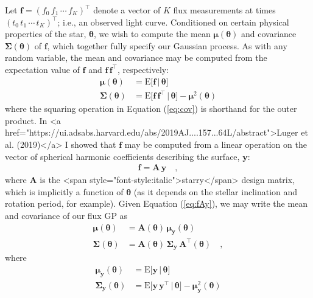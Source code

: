 Let
$\mathbf{f} = \left( f_0 \, f_1 \, \cdots \,  f_K \right)^\top$
denote a vector of $K$ flux measurements at times
$\left( t_0 \,  t_1 \,  \cdots \, t_K \right)^\top$; i.e., an observed
light curve.
Conditioned on certain physical properties of the star, $\pmb{\theta}$,
we wish to compute the mean $\pmb{\mu}(\pmb{\theta})$ and
covariance $\pmb{\Sigma}(\pmb{\theta})$
of $\mathbf{f}$, which together fully specify our Gaussian process.
As with any random variable, the mean and covariance may be computed from
the expectation value of $\mathbf{f}$ and
$\mathbf{f}\,\mathbf{f}^\top$, respectively:
\begin{align}
    \label{eq:mean}
    \pmb{\mu}(\pmb{\theta})
     & = \mathrm{E} \Big[ \mathbf{f} \, \Big| \, \pmb{\theta} \Big]
    \\
    \label{eq:cov}
    \pmb{\Sigma}(\pmb{\theta})
     & = \mathrm{E} \Big[ \mathbf{f} \, \mathbf{f}^\top \, \Big| \, \pmb{\theta} \Big] - \pmb{\mu}^2(\pmb{\theta})
\end{align}
where the squaring operation in Equation (\ref{eq:cov}) is shorthand for the outer product.
In <a href="https://ui.adsabs.harvard.edu/abs/2019AJ....157...64L/abstract">Luger et al. (2019)</a> I showed that $\mathbf{f}$ may be computed from a
linear operation on the vector of spherical harmonic coefficients
describing the surface, $\mathbf{y}$:
\begin{align}
    \label{eq:fAy}
    \mathbf{f} = \mathbf{A} \, \mathbf{y}
    \quad,
\end{align}
where $\mathbf{A}$ is the <span style="font-style:italic">starry</span> design matrix, which is implicitly
a function of $\pmb{\theta}$ (as it depends on the stellar inclination
and rotation period, for example).
Given Equation (\ref{eq:fAy}),
we may write the mean and covariance of our flux GP as
\begin{align}
    \pmb{\mu}(\pmb{\theta})
     & = \mathbf{A}(\pmb{\theta}) \, \pmb{\mu}_{\mathbf{y}}(\pmb{\theta})
    \\
    \pmb{\Sigma}(\pmb{\theta})
     & = \mathbf{A}(\pmb{\theta}) \, \pmb{\Sigma}_{\mathbf{y}} \, \mathbf{A}^\top(\pmb{\theta})
    \quad,
\end{align}
where
\begin{align}
    \label{eq:mean_y}
    \pmb{\mu}_{\mathbf{y}}(\pmb{\theta})
     & = \mathrm{E} \Big[ \mathbf{y} \, \Big| \, \pmb{\theta} \Big]
    \\
    \label{eq:cov_y}
    \pmb{\Sigma}_{\mathbf{y}}(\pmb{\theta})
     & = \mathrm{E} \Big[ \mathbf{y} \, \mathbf{y}^\top \, \Big| \, \pmb{\theta} \Big] - \pmb{\mu}_{\mathbf{y}}^2(\pmb{\theta})
\end{align}
